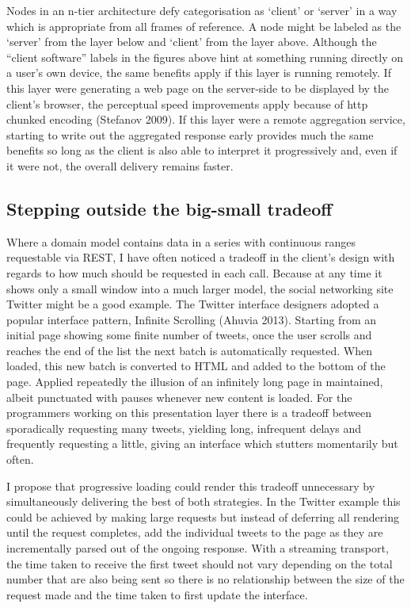\documentclass[]{article}
\begin{document}
Nodes in an n-tier architecture defy categorisation as `client' or
`server' in a way which is appropriate from all frames of reference. A
node might be labeled as the `server' from the layer below and `client'
from the layer above. Although the ``client software'' labels in the
figures above hint at something running directly on a user's own device,
the same benefits apply if this layer is running remotely. If this layer
were generating a web page on the server-side to be displayed by the
client's browser, the perceptual speed improvements apply because of
http chunked encoding (Stefanov 2009). If this layer were a remote
aggregation service, starting to write out the aggregated response early
provides much the same benefits so long as the client is also able to
interpret it progressively and, even if it were not, the overall
delivery remains faster.

\subsection{Stepping outside the big-small tradeoff}

Where a domain model contains data in a series with continuous ranges
requestable via REST, I have often noticed a tradeoff in the client's
design with regards to how much should be requested in each call.
Because at any time it shows only a small window into a much larger
model, the social networking site Twitter might be a good example. The
Twitter interface designers adopted a popular interface pattern,
Infinite Scrolling (Ahuvia 2013). Starting from an initial page showing
some finite number of tweets, once the user scrolls and reaches the end
of the list the next batch is automatically requested. When loaded, this
new batch is converted to HTML and added to the bottom of the page.
Applied repeatedly the illusion of an infinitely long page in
maintained, albeit punctuated with pauses whenever new content is
loaded. For the programmers working on this presentation layer there is
a tradeoff between sporadically requesting many tweets, yielding long,
infrequent delays and frequently requesting a little, giving an
interface which stutters momentarily but often.

I propose that progressive loading could render this tradeoff
unnecessary by simultaneously delivering the best of both strategies. In
the Twitter example this could be achieved by making large requests but
instead of deferring all rendering until the request completes, add the
individual tweets to the page as they are incrementally parsed out of
the ongoing response. With a streaming transport, the time taken to
receive the first tweet should not vary depending on the total number
that are also being sent so there is no relationship between the size of
the request made and the time taken to first update the interface.
\end{document}

